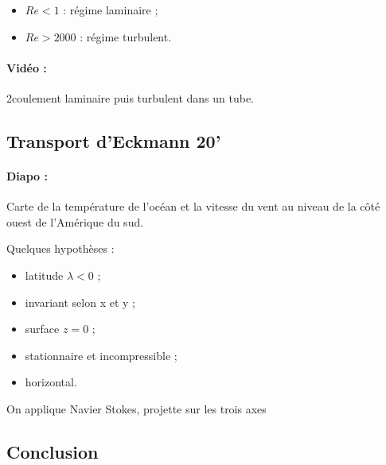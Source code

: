 \begin{itemize}
\item $Re<1$ : régime laminaire ;
\item $Re>2000$ : régime turbulent.
\end{itemize}

\paragraph{Vidéo :} 2coulement laminaire puis turbulent dans un tube.

\subsection{Transport d'Eckmann 20'}

\paragraph{Diapo :} Carte de la température de l'océan et la vitesse du vent au niveau de la côté ouest de l'Amérique du sud.

Quelques hypothèses :
\begin{itemize}
\item latitude $\lambda<0$ ;
\item invariant selon x et y ;
\item surface $z=0$ ;
\item stationnaire et incompressible ;
\item horizontal.
\end{itemize}

On applique Navier Stokes, projette sur les trois axes

\subsection{Conclusion}

